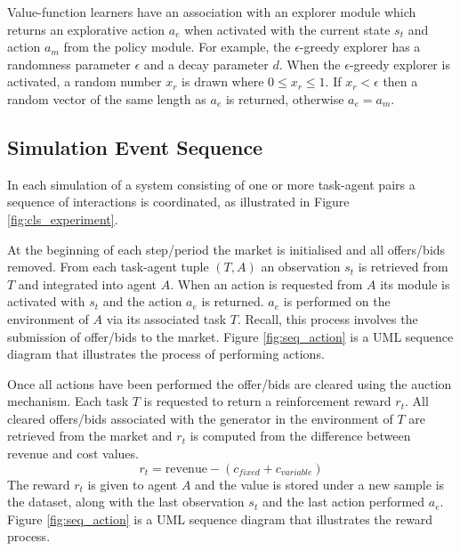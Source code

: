 
Value-function learners have an association with an explorer module which
returns an explorative action $a_e$ when activated with the current state $s_t$
and action $a_m$ from the policy module.  For example, the $\epsilon$-greedy
explorer has a randomness parameter $\epsilon$ and a decay parameter $d$.  When
the $\epsilon$-greedy explorer is activated, a random number $x_r$ is drawn
where $0 \leq x_r \leq 1$.  If $x_r < \epsilon$ then a random vector of the same
length as $a_e$ is returned, otherwise $a_e = a_m$.

\subsection{Simulation Event Sequence}



In each simulation of a system consisting of one or more task-agent pairs a
sequence of interactions is coordinated, as illustrated in Figure
\ref{fig:cls_experiment}.



At the beginning of each step/period the market is initialised and all
offers/bids removed.  From each task-agent tuple $(T,A)$ an observation $s_t$
is retrieved from $T$ and integrated into agent $A$.  When an action is
requested from $A$ its module is activated with $s_t$ and the action $a_e$ is
returned.  $a_e$ is performed on the environment of $A$ via its associated task
$T$.  Recall, this process involves the submission of offer/bids to the market.
Figure \ref{fig:seq_action} is a UML sequence diagram that illustrates the
process of performing actions.



Once all actions have been performed the offer/bids are cleared using the
auction mechanism.  Each task $T$ is requested to return a reinforcement reward
$r_t$. All cleared offers/bids associated with the generator in the environment
of $T$ are retrieved from the market and $r_t$ is computed from the difference
between revenue and cost values.
\begin{equation}
r_t = \mbox{revenue} - (c_{fixed} + c_{variable})
\end{equation}
The reward $r_t$ is given to agent $A$ and the value is stored under a new
sample is the dataset, along with the last observation $s_t$ and the last action
performed $a_e$.  Figure \ref{fig:seq_action} is a UML sequence diagram that
illustrates the reward process.

